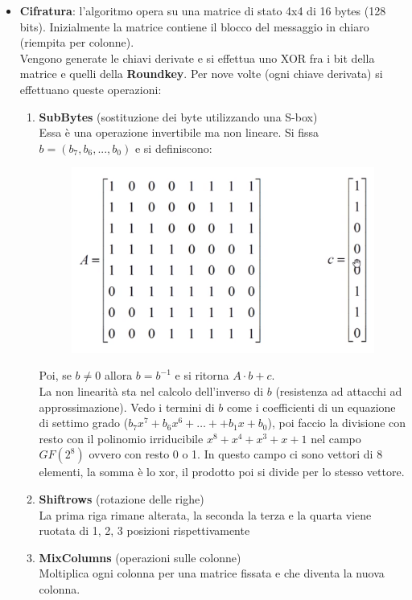 \begin{itemize}
	\item \textbf{Cifratura}: l'algoritmo opera su una matrice di stato 4x4 di 16 bytes (128 bits). Inizialmente la matrice contiene il blocco del messaggio in chiaro (riempita per colonne).\\
	Vengono generate le chiavi derivate e si effettua uno XOR fra i bit della matrice e quelli della \textbf{Roundkey}.
	Per nove volte (ogni chiave derivata) si effettuano queste operazioni:
		\begin{enumerate}
			\item \textbf{SubBytes} (sostituzione dei byte utilizzando una S-box)\\
			Essa è una operazione invertibile ma non lineare. Si fissa $b=(b_7,b_6,...,b_0)$ e si definiscono:
			\begin{figure}[h]
				\centering
				\includegraphics[width=0.7\linewidth]{immagini/img35}
			\end{figure}
			Poi, se $b\neq 0$ allora $b=b^{-1}$ e si ritorna $A \cdot b + c$.\\
			La non linearità sta nel calcolo dell'inverso di $b$ (resistenza ad attacchi ad approssimazione). Vedo i termini di $b$ come i coefficienti di un equazione di settimo grado ($b_7x^7 + b_6x^6 + \dots + +b_1x + b_0$), poi faccio la divisione con resto con il polinomio irriducibile $x^8+x^4+x^3+x+1$ nel campo $GF(2^8)$ ovvero con resto 0 o 1. In questo campo ci sono vettori di 8 elementi, la somma è lo xor, il prodotto poi si divide per lo stesso vettore.
			
			
			
			
			\item \textbf{Shiftrows} (rotazione delle righe)\\
			La prima riga rimane alterata, la seconda la terza e la quarta viene ruotata di 1, 2, 3 posizioni rispettivamente
			
			\item \textbf{MixColumns} (operazioni sulle colonne)\\
			Moltiplica ogni colonna per una matrice fissata e che diventa la nuova colonna.
			

\end{enumerate}
\end{itemize}
